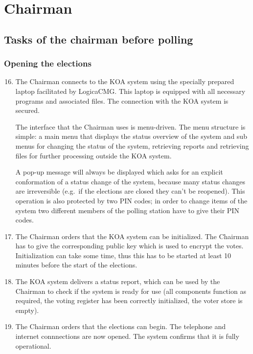 \section{Chairman}\label{sec3:chairman}

\subsection{Tasks of the chairman before polling}\label{sec3:tasks-chairm-before}

\subsubsection{Opening the elections}\label{sec3:begin-elections}

\begin{enumerate}
\setcounter{enumi}{15}
	\item The Chairman connects to the KOA system using the
	specially prepared laptop facilitated by LogicaCMG. This
	laptop is equipped with all necessary programs and associated
	files. The connection with the KOA system is secured.

	The interface that the Chairman uses is menu-driven. The menu
	structure is simple: a main menu that displays the status
	overview of the system and sub menus for changing the status
	of the system, retrieving reports and retrieving files for
	further processing outside the KOA system.

	A pop-up message will always be displayed which asks for an
	explicit conformation of a status change of the system,
	because many status changes are irreversible (e.g.\ if the
	elections are closed they can't be reopened). This operation
	is also protected by two PIN codes; in order to change items
	of the system two different members of the polling station have to give
	their PIN codes.

	\item The Chairman orders that the KOA system can be
	initialized. The Chairman has to give the corresponding public
	key which is used to encrypt the votes. Initialization can
	take some time, thus this has to be started at least 10
	minutes before the start of the elections.

	\item The KOA system delivers a status report, which can be
	used by the Chairman to check if the system is ready for use
	(all components function as required, the voting register has
	been correctly initialized, the voter store is empty).

	\item The Chairman orders that the elections can begin. The
	telephone and internet connnections are now opened. The system
	confirms that it is fully operational.

\end{enumerate}

